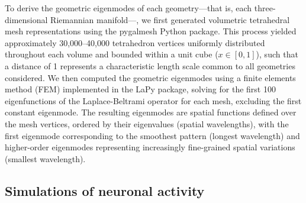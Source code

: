 \documentclass{article}
\begin{document}
To derive the geometric eigenmodes of each geometry---that is, each three-dimensional Riemannian manifold---, we first generated volumetric tetrahedral mesh representations using the pygalmesh Python package. This process yielded approximately 30,000–40,000 tetrahedron vertices uniformly distributed throughout each volume and bounded within a unit cube ($x\in[0,1]$), such that a distance of 1 represents a characteristic length scale common to all geometries considered. We then computed the geometric eigenmodes using a finite elements method (FEM) implemented in the LaPy package, solving for the first 100 eigenfunctions of the Laplace-Beltrami operator for each mesh, excluding the first constant eigenmode. The resulting eigenmodes are spatial functions defined over the mesh vertices, ordered by their eigenvalues (spatial wavelengths), with the first eigenmode corresponding to the smoothest pattern (longest wavelength) and higher-order eigenmodes representing increasingly fine-grained spatial variations (smallest wavelength).

\subsection*{Simulations of neuronal activity}
\end{document}

